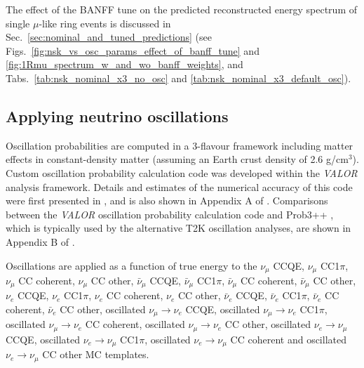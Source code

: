 The effect of the BANFF tune on the predicted reconstructed energy spectrum of
single $\mu$-like ring events is discussed in Sec.\ \ref{sec:nominal_and_tuned_predictions} (see 
Figs.\ \ref{fig:nsk_vs_osc_params_effect_of_banff_tune} and \ref{fig:1Rmu_spectrum_w_and_wo_banff_weights}, and
Tabs.\ \ref{tab:nsk_nominal_x3_no_osc} and \ref{tab:nsk_nominal_x3_default_osc}).


\subsection{Applying neutrino oscillations}
\label{sec:applying_oscillations}

Oscillation probabilities are computed in a 3-flavour framework including matter effects in constant-density matter
(assuming an Earth crust density of 2.6 g/cm$^{3}$).
Custom oscillation probability calculation code was developed within the {\em VALOR} analysis framework.
Details and estimates of the numerical accuracy of this code were first presented in \cite{OurRun12DisappAnalysis3Flavour},
and is also shown in Appendix A of \cite{OurRun123DisappAnalysis3Flavour}.
Comparisons between the {\em VALOR} oscillation probability calculation code and Prob3++ \cite{Prob3}, 
which is typically used by the alternative T2K oscillation analyses, are shown in Appendix B of \cite{OurRun123DisappAnalysis3Flavour}.

Oscillations are applied as a function of true energy to the 
  $\nu_{\mu}$ CCQE,
  $\nu_{\mu}$ CC1$\pi$, 
  $\nu_{\mu}$ CC coherent, 
  $\nu_{\mu}$ CC other, 
  $\bar{\nu}_{\mu}$ CCQE, 
  $\bar{\nu}_{\mu}$ CC1$\pi$, 
  $\bar{\nu}_{\mu}$ CC coherent, 
  $\bar{\nu}_{\mu}$ CC other, 
  $\nu_{e}$ CCQE, 
  $\nu_{e}$ CC1$\pi$,
  $\nu_{e}$ CC coherent,
  $\nu_{e}$ CC other,
  $\bar{\nu}_{e}$ CCQE, 
  $\bar{\nu}_{e}$ CC1$\pi$,
  $\bar{\nu}_{e}$ CC coherent,
  $\bar{\nu}_{e}$ CC other,
  oscillated $\nu_{\mu} \rightarrow \nu_{e}$ CCQE,
  oscillated $\nu_{\mu} \rightarrow \nu_{e}$ CC1$\pi$,
  oscillated $\nu_{\mu} \rightarrow \nu_{e}$ CC coherent,
  oscillated $\nu_{\mu} \rightarrow \nu_{e}$ CC other,
  oscillated $\nu_{e} \rightarrow \nu_{\mu}$ CCQE,
  oscillated $\nu_{e} \rightarrow \nu_{\mu}$ CC1$\pi$,
  oscillated $\nu_{e} \rightarrow \nu_{\mu}$ CC coherent and
  oscillated $\nu_{e} \rightarrow \nu_{\mu}$ CC other
MC templates.

